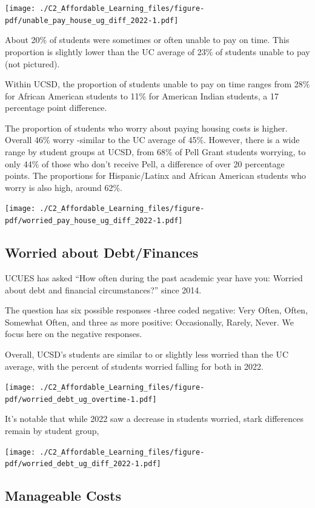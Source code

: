 \documentclass[
  letterpaper,
  DIV=11,
  numbers=noendperiod]{scrreprt}
\begin{document}
\texttt{[image: ./C2\_Affordable\_Learning\_files/figure-pdf/unable\_pay\_house\_ug\_diff\_2022-1.pdf]}

About 20\% of students were sometimes or often unable to pay on time.
This proportion is slightly lower than the UC average of 23\% of
students unable to pay (not pictured).

Within UCSD, the proportion of students unable to pay on time ranges
from 28\% for African American students to 11\% for American Indian
students, a 17 percentage point difference.

The proportion of students who worry about paying housing costs is
higher. Overall 46\% worry -similar to the UC average of 45\%. However,
there is a wide range by student groups at UCSD, from 68\% of Pell Grant
students worrying, to only 44\% of those who don't receive Pell, a
difference of over 20 percentage points. The proportions for
Hispanic/Latinx and African American students who worry is also high,
around 62\%.

\texttt{[image: ./C2\_Affordable\_Learning\_files/figure-pdf/worried\_pay\_house\_ug\_diff\_2022-1.pdf]}

\hypertarget{worried-about-debtfinances}{%
\subsection{Worried about
Debt/Finances}\label{worried-about-debtfinances}}

UCUES has asked ``How often during the past academic year have you:
Worried about debt and financial circumstances?'' since 2014.

The question has six possible responses -three coded negative: Very
Often, Often, Somewhat Often, and three as more positive: Occasionally,
Rarely, Never. We focus here on the negative responses.

Overall, UCSD's students are similar to or slightly less worried than
the UC average, with the percent of students worried falling for both in
2022.

\texttt{[image: ./C2\_Affordable\_Learning\_files/figure-pdf/worried\_debt\_ug\_overtime-1.pdf]}

It's notable that while 2022 saw a decrease in students worried, stark
differences remain by student group,

\texttt{[image: ./C2\_Affordable\_Learning\_files/figure-pdf/worried\_debt\_ug\_diff\_2022-1.pdf]}

\hypertarget{manageable-costs}{%
\subsection{Manageable Costs}\label{manageable-costs}}
\end{document}
